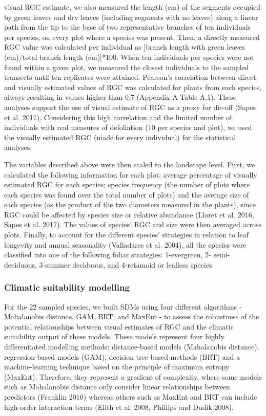 \documentclass[11pt,twoside]{reedthesis}
\begin{document}
visual RGC estimate, we also measured the length (cm) of the segments
occupied by green leaves and dry leaves (including segments with no
leaves) along a linear path from the tip to the base of two
representative branches of ten individuals per species, on every plot
where a species was present. Then, a directly measured RGC value was
calculated per individual as {[}branch length with green leaves
(cm)/total branch length (cm){]}*100. When ten individuals per species
were not found within a given plot, we measured the closest individuals
to the sampled transects until ten replicates were attained. Pearson's
correlation between direct and visually estimated values of RGC was
calculated for plants from each species, always resulting in values
higher than 0.7 (Appendix A Table A.1). These analyses support the use
of visual estimate of RGC as a proxy for die-off (Sapes et al. 2017).
Considering this high correlation and the limited number of individuals
with real measures of defoliation (10 per species and plot), we used the
visually estimated RGC (made for every individual) for the statistical
analyses.\par

The variables described above were then scaled to the landscape level.
First, we calculated the following information for each plot: average
percentage of visually estimated RGC for each species; species frequency
(the number of plots where each species was found over the total number
of plots) and the average size of each species (as the product of the
two diameters measured in the plants), since RGC could be affected by
species size or relative abundance (Lloret et al. 2016, Sapes et al.
2017). The values of species' RGC and size were then averaged across
plots. Finally, to account for the different species' strategies in
relation to leaf longevity and annual seasonality (Valladares et al.
2004), all the species were classified into one of the following foliar
strategies: 1-evergreen, 2- semi-deciduous, 3-summer deciduous, and
4-retamoid or leafless species.\par

\subsubsection{Climatic suitability
modelling}\label{climatic-suitability-modelling}

For the 22 sampled species, we built SDMs using four different
algorithms - Mahalanobis distance, GAM, BRT, and MaxEnt - to assess the
robustness of the potential relationships between visual estimates of
RGC and the climatic suitability output of these models. These models
represent four highly differentiated modelling methods: distance-based
models (Mahalanobis distance), regression-based models (GAM), decision
tree-based methods (BRT) and a machine-learning technique based on the
principle of maximum entropy (MaxEnt). Therefore, they represent a
gradient of complexity, where some models such as Mahalanobis distance
only consider linear relationships between predictors (Franklin 2010)
whereas others such as MaxEnt and BRT can include high-order interaction
terms (Elith et al. 2008, Phillips and Dudík 2008).\par
\end{document}
